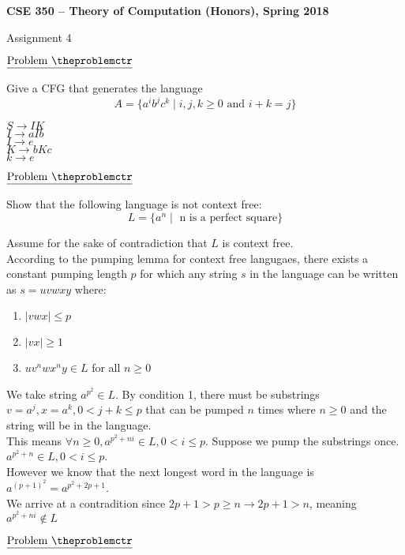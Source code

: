 \documentclass[11pt]{article}
\def\pp{\par\noindent}
\begin{document}
\centerline{\bf CSE 350 -- Theory of Computation (Honors), Spring 2018}
\medskip
\centerline{Assignment 4}

\bigskip
\bigskip


\addtocounter{problemctr}{1}

\noindent $\underline{\rm Problem\ \theproblemctr}$\pp
	Give a CFG that generates the language
	$$ A = \{ a^ib^jc^k \mid i,j,k \geq 0 \mbox{ and } i + k = j\} $$

\noindent
$S\rightarrow IK$\\
$I\rightarrow aIb$\\
$I\rightarrow e$\\
$K\rightarrow bKc$\\
$k\rightarrow e$

\bigskip
\addtocounter{problemctr}{1}

\noindent $\underline{\rm Problem\ \theproblemctr}$\pp
Show that the following language is not context free:
$$ L = \{ a^n \mid \mbox{ n is a perfect square}\} $$

Assume for the sake of contradiction that $L$ is context free.\\
According to the pumping lemma for context free langugaes, there exists a constant pumping length $p$ for which any string $s$ in the language can be written as $s=uvwxy$ where:
\begin{enumerate}
    \item $|vwx|\leq p$
    \item $|vx|\geq 1$
    \item $uv^nwx^ny \in L$ for all $n\geq0$
\end{enumerate}

We take string $a^{p^2}\in L$. By condition 1, there must be substrings $v=a^j,x=a^k,0<j+k\leq p$ that can be pumped $n$ times where $n\geq0$ and the string will be in the language.\\
This means $\forall n\geq0, a^{p^2+ni}\in L,0<i\leq p$. Suppose we pump the substrings once. $a^{p^2+n}\in L,0<i\leq p$.\\
However we know that the next longest word in the language is $a^{(p+1)^2}=a^{p^2+2p+1}$.\\
We arrive at a contradition since $2p+1>p\geq n \rightarrow 2p+1>n$, meaning $a^{p^2+ni}\not\in L$

\bigskip
\bigskip
\addtocounter{problemctr}{1}

\noindent $\underline{\rm Problem\ \theproblemctr}$\pp
\end{document}
